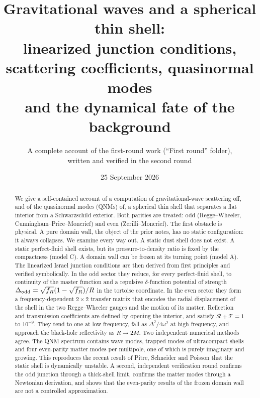 \documentclass[11pt,a4paper]{article}
\title{Gravitational waves and a spherical thin shell:\\[2pt]
\large linearized junction conditions, scattering coefficients, quasinormal modes\\
and the dynamical fate of the background}
\author{A complete account of the first-round work (``First round'' folder),\\
written and verified in the second round}
\date{25 September 2026}
\numberwithin{equation}{section}
\newcommand{\sq}{\sqrt{f_R}}
\newcommand{\RR}{\mathcal R}
\newcommand{\TT}{\mathcal T}
\begin{document}
\maketitle

\begin{abstract}
We give a self-contained account of a computation of gravitational-wave scattering off, and of the
quasinormal modes (QNMs) of, a spherical thin shell that separates a flat interior from a Schwarzschild exterior.
Both parities are treated: odd (Regge--Wheeler, Cunningham--Price--Moncrief) and even (Zerilli--Moncrief).
The first obstacle is physical. A pure domain wall, the object of the prior notes, has no static configuration:
it always collapses. We examine every way out. A static dust shell does not exist. A static perfect-fluid
shell exists, but its pressure-to-density ratio is fixed by the compactness (model C). A domain wall can be frozen at its
turning point (model A). The linearized Israel junction conditions are then derived from first principles and
verified symbolically. In the odd sector they reduce, for every perfect-fluid shell, to continuity of the master
function and a repulsive $\delta$-function potential of strength $\Delta_{\rm odd}=\sq(1-\sq)/R$ in the tortoise
coordinate. In the even sector they form a frequency-dependent $2\times2$ transfer matrix that encodes the radial
displacement of the shell in the two Regge--Wheeler gauges and the motion of its matter. Reflection and transmission
coefficients are defined by opening the interior, and satisfy $\RR+\TT=1$ to $10^{-9}$. They tend to one at low
frequency, fall as $\Delta^2/4\omega^2$ at high frequency, and approach the black-hole reflectivity as $R\to2M$.
Two independent numerical methods agree. The QNM spectrum contains wave modes, trapped modes of ultracompact shells and
four even-parity matter modes per multipole, one of which is purely imaginary and growing. This reproduces the recent
result of Pitre, Schneider and Poisson that the static shell is dynamically unstable. A second, independent
verification round confirms the odd junction through a thick-shell limit, confirms the matter modes through a
Newtonian derivation, and shows that the even-parity results of the frozen domain wall are not a controlled
approximation.
\end{abstract}

\tableofcontents
\newpage

\end{document}
